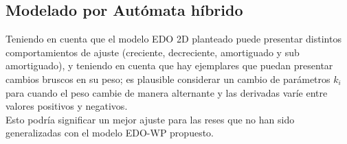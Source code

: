 \subsection{Modelado por Autómata híbrido}
Teniendo en cuenta que el modelo EDO 2D planteado puede presentar distintos comportamientos de ajuste (creciente, decreciente, amortiguado y sub amortiguado), y teniendo en cuenta que hay ejemplares que puedan presentar cambios bruscos en su peso; es plausible considerar un cambio de parámetros $k_{i}$ para cuando el peso cambie de manera alternante y las derivadas varíe entre valores positivos y negativos.\\

Esto podría significar un mejor ajuste para las reses que no han sido generalizadas con el modelo EDO-WP propuesto.

\pagebreak



